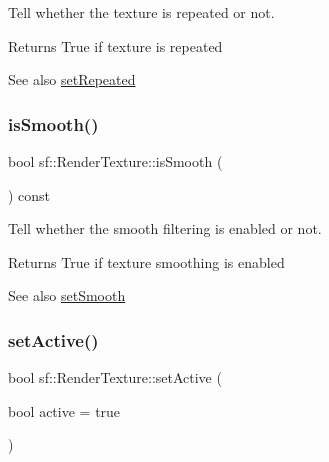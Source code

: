 Tell whether the texture is repeated or not. 

\begin{DoxyReturn}{Returns}
True if texture is repeated
\end{DoxyReturn}
\begin{DoxySeeAlso}{See also}
\hyperlink{classsf_1_1_render_texture_af8f97b33512bf7d5b6be3da6f65f7365}{set\+Repeated} 
\end{DoxySeeAlso}
\mbox{\label{classsf_1_1_render_texture_a5b43c007ab6643accc5dae84b5bc8f61}} 
\subsubsection{\texorpdfstring{is\+Smooth()}{isSmooth()}}
{\footnotesize\ttfamily bool sf\+::\+Render\+Texture\+::is\+Smooth (\begin{DoxyParamCaption}{ }\end{DoxyParamCaption}) const}



Tell whether the smooth filtering is enabled or not. 

\begin{DoxyReturn}{Returns}
True if texture smoothing is enabled
\end{DoxyReturn}
\begin{DoxySeeAlso}{See also}
\hyperlink{classsf_1_1_render_texture_af08991e63c6020865dd07b20e27305b6}{set\+Smooth} 
\end{DoxySeeAlso}
\mbox{\label{classsf_1_1_render_texture_a5da95ecdbce615a80bb78399012508cf}} 
\subsubsection{\texorpdfstring{set\+Active()}{setActive()}}
{\footnotesize\ttfamily bool sf\+::\+Render\+Texture\+::set\+Active (\begin{DoxyParamCaption}\item[{bool}]{active = {\ttfamily true} }\end{DoxyParamCaption})}



